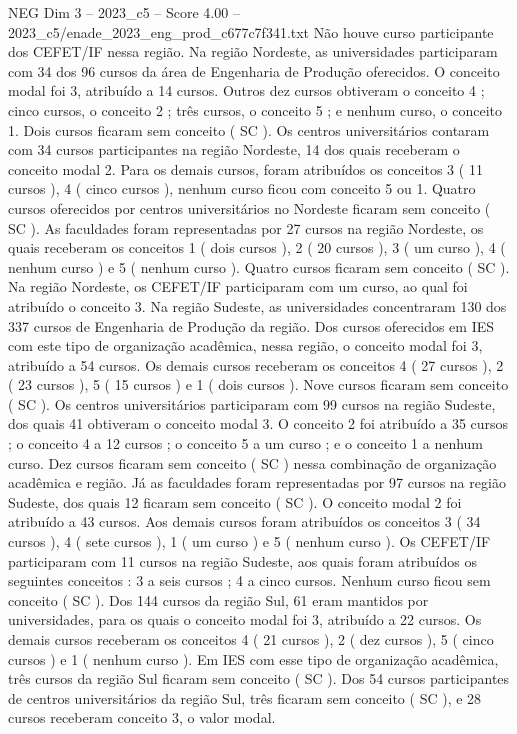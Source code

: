 \begin{textsample}{NEG Dim 3 – 2023\_c5 – Score 4.00 – 2023\_c5/enade\_2023\_eng\_prod\_c677c7f341.txt}
Não houve curso participante dos CEFET/IF nessa região.
Na região Nordeste, as universidades participaram com 34 dos 96 cursos da área de Engenharia de Produção oferecidos.
O conceito modal foi 3, atribuído a 14 cursos.
Outros dez cursos obtiveram o conceito 4 ; cinco cursos, o conceito 2 ; três cursos, o conceito 5 ; e nenhum curso, o conceito 1.
Dois cursos ficaram sem conceito ( SC ).
Os centros universitários contaram com 34 cursos participantes na região Nordeste, 14 dos quais receberam o conceito modal 2.
Para os demais cursos, foram atribuídos os conceitos 3 ( 11 cursos ), 4 ( cinco cursos ), nenhum curso ficou com conceito 5 ou 1.
Quatro cursos oferecidos por centros universitários no Nordeste ficaram sem conceito ( SC ).
As faculdades foram representadas por 27 cursos na região Nordeste, os quais receberam os conceitos 1 ( dois cursos ), 2 ( 20 cursos ), 3 ( um curso ), 4 ( nenhum curso ) e 5 ( nenhum curso ).
Quatro cursos ficaram sem conceito ( SC ).
Na região Nordeste, os CEFET/IF participaram com um curso, ao qual foi atribuído o conceito 3.
Na região Sudeste, as universidades concentraram 130 dos 337 cursos de Engenharia de Produção da região.
Dos cursos oferecidos em IES com este tipo de organização acadêmica, nessa região, o conceito modal foi 3, atribuído a 54 cursos.
Os demais cursos receberam os conceitos 4 ( 27 cursos ), 2 ( 23 cursos ), 5 ( 15 cursos ) e 1 ( dois cursos ).
Nove cursos ficaram sem conceito ( SC ).
Os centros universitários participaram com 99 cursos na região Sudeste, dos quais 41 obtiveram o conceito modal 3.
O conceito 2 foi atribuído a 35 cursos ; o conceito 4 a 12 cursos ; o conceito 5 a um curso ; e o conceito 1 a nenhum curso.
Dez cursos ficaram sem conceito ( SC ) nessa combinação de organização acadêmica e região.
Já as faculdades foram representadas por 97 cursos na região Sudeste, dos quais 12 ficaram sem conceito ( SC ).
O conceito modal 2 foi atribuído a 43 cursos.
Aos demais cursos foram atribuídos os conceitos 3 ( 34 cursos ), 4 ( sete cursos ), 1 ( um curso ) e 5 ( nenhum curso ).
Os CEFET/IF participaram com 11 cursos na região Sudeste, aos quais foram atribuídos os seguintes conceitos : 3 a seis cursos ; 4 a cinco cursos.
Nenhum curso ficou sem conceito ( SC ).
Dos 144 cursos da região Sul, 61 eram mantidos por universidades, para os quais o conceito modal foi 3, atribuído a 22 cursos.
Os demais cursos receberam os conceitos 4 ( 21 cursos ), 2 ( dez cursos ), 5 ( cinco cursos ) e 1 ( nenhum curso ).
Em IES com esse tipo de organização acadêmica, três cursos da região Sul ficaram sem conceito ( SC ).
Dos 54 cursos participantes de centros universitários da região Sul, três ficaram sem conceito ( SC ), e 28 cursos receberam conceito 3, o valor modal.

\end{textsample}

